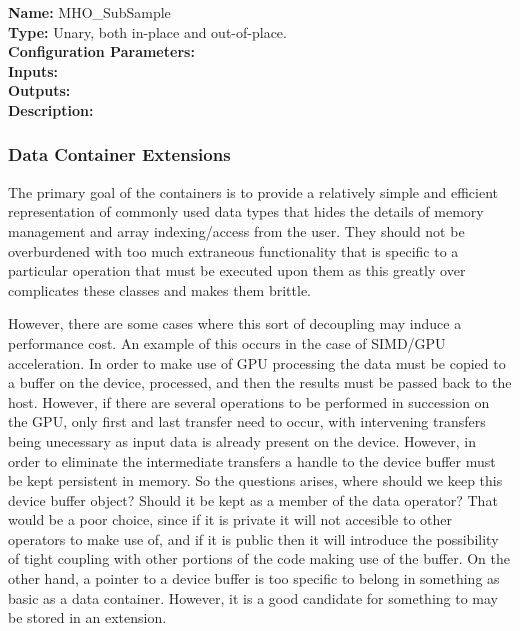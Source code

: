 \noindent \textbf{Name:} MHO\_SubSample  \\
\textbf{Type:} Unary, both in-place and out-of-place. \\
\textbf{Configuration Parameters:} \\
\textbf{Inputs:} \\
\textbf{Outputs:} \\
\textbf{Description:} \\




\subsubsection{Data Container Extensions}

The primary goal of the containers is to provide a relatively simple and efficient representation of commonly used data types that hides the details of
memory management and array indexing/access from the user. They should not be overburdened with too much extraneous functionality that is specific to a particular operation that must be executed upon them as this greatly
over complicates these classes and makes them brittle. 

However, there are some cases where this sort of decoupling may induce a performance cost. An example of
this occurs in the case of SIMD/GPU acceleration. In order to make use of GPU processing the data must be copied to a buffer on the device, processed, and then the results must be passed back to the host. However, if there are several operations to be performed in succession on the GPU, only first and last transfer need to occur, with intervening transfers being unecessary as input data is already present on the device. However, in order to eliminate the intermediate transfers a handle to the device buffer must be kept persistent in memory. So the questions arises, where should we keep this device buffer object? Should it be kept as a member of the data operator? That would be a poor choice, since if it is private it will not accesible to other operators to make use of, and if it is public then it will introduce the possibility of tight coupling with other portions of the code making use of the buffer. On the other hand, a pointer to a device buffer is too specific to belong in something as basic as a data container. However, it is a good candidate for something to may be stored in an extension.

